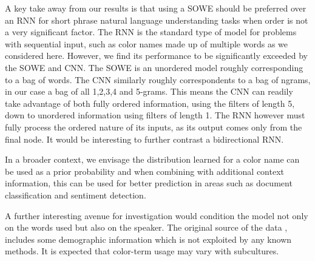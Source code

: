 \documentclass[]{clv3}
\newcommand{\textcite}{\citet}
\begin{document}
A key take away from our results is that using a SOWE should be preferred over an RNN for short phrase natural language understanding tasks when order is not a very significant factor.
The RNN is the standard type of model for problems with sequential input, such as color names made up of multiple words as we considered here.
However, we find its performance to be significantly exceeded by the SOWE and CNN.
The SOWE is an unordered model roughly corresponding to a bag of words.
The CNN similarly roughly correspondents to a bag of ngrams, in our case a bag of all 1,2,3,4 and 5-grams.
This means the CNN can readily take advantage of both fully ordered information, using the filters of length 5, down to unordered information using  filters of length 1.
The RNN however must fully process the ordered nature of its inputs, as its output comes only from the final node.
It would be interesting to further contrast a bidirectional RNN.

In a broader context, we envisage the distribution learned for a color name can be used as a prior probability and when combining with additional context information, this can be used for better prediction in areas such as document classification and sentiment detection.

A further interesting avenue for investigation would condition the model not only on the words used but also on the speaker.
The original source of the data \textcite{Munroe2010XKCDdataset}, includes some demographic information which is not exploited by any known methods.
It is expected that color-term usage may vary with subcultures.


\clearpage


\clearpage
\appendix

\end{document}
